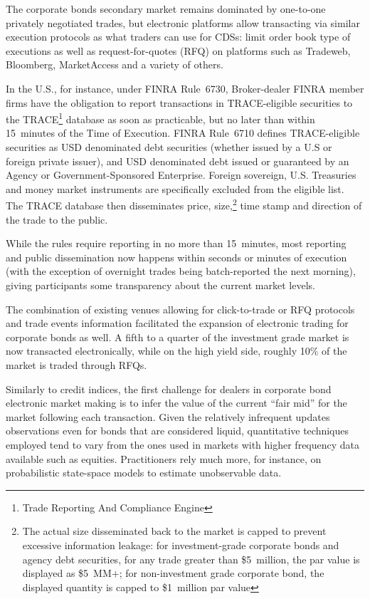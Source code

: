 \begin{enumerate}
The corporate bonds secondary market remains dominated by one-to-one privately negotiated trades, but electronic platforms allow transacting via similar execution protocols as what traders can use for CDSs: limit order book type of executions as well as request-for-quotes (RFQ) on platforms such as Tradeweb, Bloomberg, MarketAccess and a variety of others.


In the U.S., for instance, under FINRA Rule~6730, Broker-dealer FINRA member firms have the obligation to report transactions in TRACE-eligible securities to the TRACE\footnote{Trade Reporting And Compliance Engine} database as soon as practicable, but no later than within 15~minutes of the Time of Execution. FINRA Rule~6710 defines TRACE-eligible securities as USD denominated debt securities (whether issued by a U.S or foreign private issuer), and USD denominated debt issued or guaranteed by an Agency or Government-Sponsored Enterprise. Foreign sovereign, U.S. Treasuries and money market instruments are specifically excluded from the eligible list. The TRACE database then disseminates price, size,\footnote{The actual size disseminated back to the market is capped to prevent excessive information leakage: for investment-grade corporate bonds and agency debt securities, for any trade greater than \$5~million, the par value is displayed as \$5~MM$+$; for non-investment grade corporate bond, the displayed quantity is capped to \$1~million par value} time stamp and direction of the trade to the public.


While the rules require reporting in no more than 15~minutes, most reporting and public dissemination now happens within seconds or minutes of execution (with the exception of overnight trades being batch-reported the next morning), giving participants some transparency about the current market levels.


The combination of existing venues allowing for click-to-trade or RFQ protocols and trade events information facilitated the expansion of electronic trading for corporate bonds as well. A fifth to a quarter of the investment grade market is now transacted electronically, while on the high yield side, roughly 10\% of the market is traded through RFQs.


Similarly to credit indices, the first challenge for dealers in corporate bond electronic market making is to infer the value of the current ``fair mid'' for the market following each transaction. Given the relatively infrequent updates observations even for bonds that are considered liquid, quantitative techniques employed tend to vary from the ones used in markets with higher frequency data available such as equities. Practitioners rely much more, for instance, on probabilistic state-space models to estimate unobservable data.



\end{enumerate}
